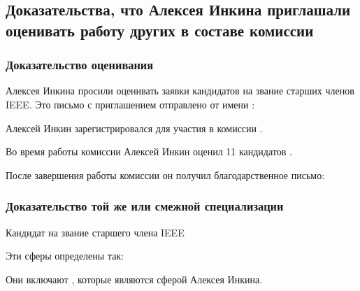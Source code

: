 \subsection{%
    Доказательства, что Алексея Инкина приглашали оценивать работу других в составе комиссии%
}
\label{subsec:Judging}


\subsubsection{Доказательство оценивания}

Алексея Инкина просили оценивать заявки кандидатов на звание старших членов IEEE.
Это письмо с приглашением отправлено от имени \DrZakaria:


Алексей Инкин зарегистрировался для участия в комиссии .

Во время работы комиссии Алексей Инкин оценил 11 кандидатов .

После завершения работы комиссии он получил благодарственное письмо:



\subsubsection{Доказательство той же или смежной специализации}

Кандидат на звание старшего члена IEEE


Эти сферы определены так:


Они включают , которые являются сферой Алексея Инкина.


